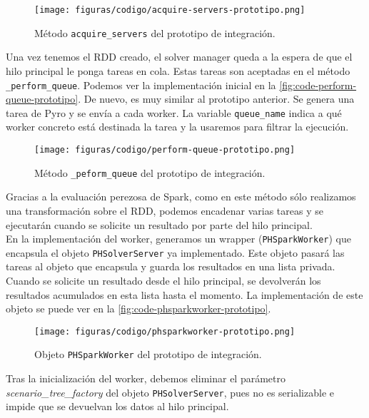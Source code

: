 \begin{figure}[]
    \centerline{\texttt{[image: figuras/codigo/acquire-servers-prototipo.png]}}
    \caption{Método \texttt{acquire\_servers} del prototipo de integración.}
    \label{fig:code-acquire-servers-prototipo}
\end{figure}

Una vez tenemos el RDD creado, el solver manager queda a la espera de que el hilo principal le ponga tareas en cola. Estas tareas son aceptadas en el método \texttt{\_perform\_queue}. Podemos ver la implementación inicial en la \autoref{fig:code-perform-queue-prototipo}. De nuevo, es muy similar al prototipo anterior. Se genera una tarea de Pyro y se envía a cada worker. La variable \texttt{queue\_name} indica a qué worker concreto está destinada la tarea y la usaremos para filtrar la ejecución. \\

\begin{figure}[]
    \centerline{\texttt{[image: figuras/codigo/perform-queue-prototipo.png]}}
    \caption{Método \texttt{\_peform\_queue} del prototipo de integración.}
    \label{fig:code-perform-queue-prototipo}
\end{figure}

Gracias a la evaluación perezosa de Spark, como en este método sólo realizamos una transformación sobre el RDD, podemos encadenar varias tareas y se ejecutarán cuando se solicite un resultado por parte del hilo principal.\\

En la implementación del worker, generamos un wrapper (\texttt{PHSparkWorker}) que encapsula el objeto \texttt{PHSolverServer} ya implementado. Este objeto pasará las tareas al objeto que encapsula y guarda los resultados en una lista privada. Cuando se solicite un resultado desde el hilo principal, se devolverán los resultados acumulados en esta lista hasta el momento. La implementación de este objeto se puede ver en la \autoref{fig:code-phsparkworker-prototipo}.\\

\begin{figure}[]
    \centerline{\texttt{[image: figuras/codigo/phsparkworker-prototipo.png]}}
    \caption{Objeto \texttt{PHSparkWorker} del prototipo de integración.}
    \label{fig:code-phsparkworker-prototipo}
\end{figure}

Tras la inicialización del worker, debemos eliminar el parámetro \textit{scenario\_tree\_factory} del objeto \texttt{PHSolverServer}, pues no es serializable e impide que se devuelvan los datos al hilo principal.

